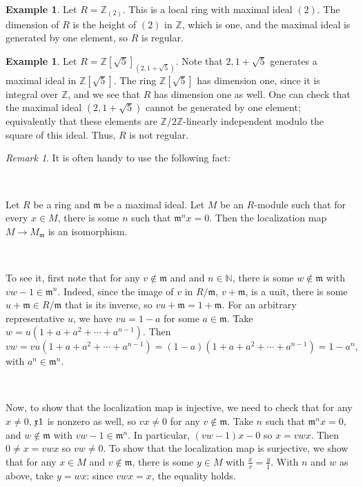 \documentclass{amsart}[12pt]
\newcommand{\Z}{\mathbb{Z}}
\newcommand{\N}{\mathbb{N}}
\newcommand{\fm}{{\mathfrak m}}
\numberwithin{equation}{section}
\theoremstyle{plain} %
\theoremstyle{definition}
\newtheorem{ex}[equation]{Example}
\theoremstyle{remark}
\newtheorem{rem}[equation]{Remark}
\begin{document}
\begin{ex}
Let $R=\Z_{(2)}$. This is a local ring with maximal ideal $(2)$. The dimension of $R$ is the height of $(2)$ in $\Z$, which is one, and the maximal ideal is generated by one element, so $R$ is regular.
\end{ex}

\begin{ex}
Let $R=\Z[\sqrt{5}]_{(2,1+\sqrt{5})}$. Note that $2,1+\sqrt{5}$ generates a maximal ideal in $\Z[\sqrt{5}]$. The ring $\Z[\sqrt{5}]$ has dimension one, since it is integral over $\Z$, and we see that $R$ has dimension one as well. One can check that the maximal ideal $(2,1+\sqrt{5})$ cannot be generated by one element; equivalently that these elements are $\Z/2\Z$-linearly independent modulo the square of this ideal. Thus, $R$ is not regular.
\end{ex}


\begin{rem} It is often handy to use the following fact:

\

Let $R$ be a ring and $\fm$ be a maximal ideal. Let $M$ be an $R$-module such that for every $x\in M$, there is some $n$ such that $\fm^n x=0$. Then the localization map $M\to M_\fm$ is an isomorphism.

\ 

To see it, first note that for any $v\notin \fm$ and and $n\in \N$, there is some $w\notin \fm$ with $vw-1\in \fm^n$. Indeed, since the image of $v$ in $R/\fm$, $v+\fm$, is a unit, there is some $u+ \fm\in R/\fm$ that is its inverse, so $vu+ \fm = 1+\fm$. For an arbitrary representative $u$, we have $vu=1-a$ for some $a\in \fm$. Take $w=u(1+a+a^2+\cdots+a^{n-1})$. Then \[vw=vu(1+a+a^2+\cdots+a^{n-1})=(1-a)(1+a+a^2+\cdots+a^{n-1})=1-a^{n},\]
with $a^n\in \fm^n$.

\

Now, to show that the localization map is injective, we need to check that for any $x\neq 0$, $\frak{x}{1}$ is nonzero as well, so $vx\neq 0$ for any $v\notin \fm$. Take $n$ such that $\fm^n x=0$, and $w\notin\fm$ with $vw-1\in \fm^n$. In particular, $(vw-1)x-0$ so $x=vwx$. Then $0\neq x = vwx$ so $vw\neq 0$.
To show that the localization map is surjective, we show that for any $x\in M$ and $v\notin \fm$, there is some $y\in M$ with $\frac{x}{v} =\frac{y}{1}$. With $n$ and $w$ as above, take $y=wx$: since $vwx=x$, the equality holds.
\end{rem}
\end{document}
